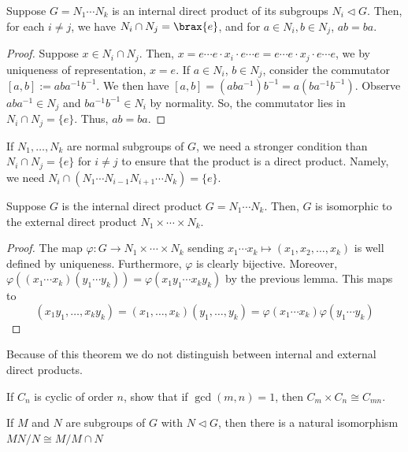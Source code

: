 \begin{lem}
    Suppose $G=N_1\cdots N_k$ is an internal direct product of its subgroups $N_i \lhd G$. Then, for each $i \neq j$, we have $N_i \cap N_j = \brax{e}$, and for $a \in N_i, b \in N_j$, $ab=ba$.
\end{lem}

\begin{proof}
    Suppose $x \in N_i \cap N_j$. Then, $x=e\cdots e \cdot x_i\cdot e \cdots e=e \cdots e \cdot x_j \cdot e \cdots e$, we by uniqueness of representation, $x=e$. If $a \in N_i$, $b \in N_j$, consider the commutator $[a,b] := aba^{-1}b^{-1}$. We then have $[a,b]=(aba^{-1})b^{-1}=a(ba^{-1}b^{-1})$. Observe $aba^{-1} \in N_j$ and $ba^{-1}b^{-1} \in N_i$ by normality. So, the commutator lies in $N_i \cap N_j = \{e\}$. Thus, $ab=ba$.
\end{proof}

\begin{rmk}
    If $N_1,\dots,N_k$ are normal subgroups of $G$, we need a stronger condition than $N_i \cap N_j = \{e\}$ for $i \neq j$ to ensure that the product is a direct product. Namely, we need $N_i \cap(N_1\cdots N_{i-1}N_{i+1}\cdots N_k)=\{e\}$.
\end{rmk}

\begin{thm}
    Suppose $G$ is the internal direct product $G=N_1\cdots N_k$. Then, $G$ is isomorphic to the external direct product $N_1 \times \cdots \times N_k$.
\end{thm}

\begin{proof}
    The map $\varphi :G\to N_1 \times \cdots \times N_k$ sending $x_1\cdots x_k \mapsto (x_1,x_2,\dots,x_k)$ is well defined by uniqueness. Furthermore, $\varphi$ is clearly bijective. Moreover, $\varphi((x_1\cdots x_k)(y_1\cdots y_k))=\varphi(x_1y_1\cdots x_ky_k)$ by the previous lemma. This maps to
    $$(x_1y_1,\dots,x_ky_k)=(x_1,\dots,x_k)(y_1,\dots,y_k)=\varphi(x_1\cdots x_k)\varphi (y_1\cdots y_k)$$
\end{proof}

Because of this theorem we do not distinguish between internal and external direct products.

\begin{ex}[On Homework]
    If $C_n$ is cyclic of order $n$, show that if $\gcd (m,n)=1$, then $C_m \times C_n \cong C_{mn}$.
\end{ex}

\begin{thm}
    If $M$ and $N$ are subgroups of $G$ with $N \lhd G$, then there is a natural isomorphism $MN/N\cong M/M\cap N$
\end{thm}

